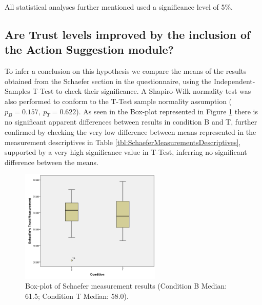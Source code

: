 All statistical analyses further mentioned used a significance level of 5\%.

\subsection*{Are Trust levels improved by the inclusion of the Action Suggestion module?}
To infer a conclusion on this hypothesis we compare the means of the results obtained from the Schaefer section in the questionnaire, using the Independent-Samples T-Test to check their significance. A Shapiro-Wilk normality test was also performed to conform to the T-Test sample normality assumption ($p_B=0.157,\ p_T=0.622$).  As seen in the Box-plot represented in Figure \ref{fig:SchaeferMeasurementResults} there is no significant apparent differences between results in condition B and T, further confirmed by checking the very low difference between means represented in the measurement descriptives in Table \ref{tbl:SchaeferMeasurementsDescriptives}, supported by a very high significance value in T-Test, inferring no significant difference between the means.

\begin{figure}[hbt]
    \centering
    \includegraphics[width=0.6\textwidth]{graphs/Schaefer.png}
    \caption{Box-plot of Schaefer measurement results (Condition B Median: 61.5; Condition T Median: 58.0).}
    \label{fig:SchaeferMeasurementResults}
\end{figure}

